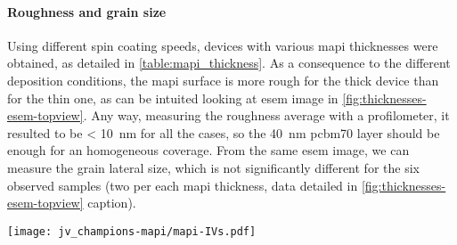 \paragraph{Roughness and grain size}
Using different spin coating speeds, devices with various \gls{mapi} thicknesses were obtained, as detailed in \cref{table:mapi_thickness}.
As a consequence to the different deposition conditions, the \gls{mapi} surface is more rough for the thick device than for the thin one, as can be intuited looking at \gls{esem} image in \cref{fig:thicknesses-esem-topview}.
Any way, measuring the roughness average with a profilometer, it resulted to be \SI{< 10}{\nm} for all the cases, so the \SI{40}{\nm} \gls{pcbm70} layer should be enough for an homogeneous coverage.
From the same \gls{esem} image, we can measure the grain lateral size, which is not significantly different for the six observed samples (two per each \gls{mapi} thickness, data detailed in \cref{fig:thicknesses-esem-topview} caption).

\begin{SCfigure}
	\centering
	\texttt{[image: jv\_champions-mapi/mapi-IVs.pdf]}
	\label{fig:thicknesses-jv_champions-mapi}
\end{SCfigure}

